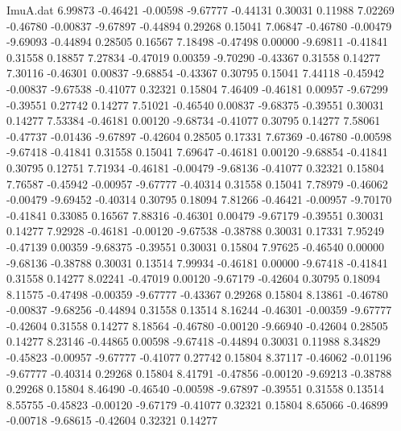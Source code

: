 \begin{filecontents}{ImuA.dat}
   6.99873   -0.46421   -0.00598   -9.67777   -0.44131    0.30031    0.11988
   7.02269   -0.46780   -0.00837   -9.67897   -0.44894    0.29268    0.15041
   7.06847   -0.46780   -0.00479   -9.69093   -0.44894    0.28505    0.16567
   7.18498   -0.47498    0.00000   -9.69811   -0.41841    0.31558    0.18857
   7.27834   -0.47019    0.00359   -9.70290   -0.43367    0.31558    0.14277
   7.30116   -0.46301    0.00837   -9.68854   -0.43367    0.30795    0.15041
   7.44118   -0.45942   -0.00837   -9.67538   -0.41077    0.32321    0.15804
   7.46409   -0.46181    0.00957   -9.67299   -0.39551    0.27742    0.14277
   7.51021   -0.46540    0.00837   -9.68375   -0.39551    0.30031    0.14277
   7.53384   -0.46181    0.00120   -9.68734   -0.41077    0.30795    0.14277
   7.58061   -0.47737   -0.01436   -9.67897   -0.42604    0.28505    0.17331
   7.67369   -0.46780   -0.00598   -9.67418   -0.41841    0.31558    0.15041
   7.69647   -0.46181    0.00120   -9.68854   -0.41841    0.30795    0.12751
   7.71934   -0.46181   -0.00479   -9.68136   -0.41077    0.32321    0.15804
   7.76587   -0.45942   -0.00957   -9.67777   -0.40314    0.31558    0.15041
   7.78979   -0.46062   -0.00479   -9.69452   -0.40314    0.30795    0.18094
   7.81266   -0.46421   -0.00957   -9.70170   -0.41841    0.33085    0.16567
   7.88316   -0.46301    0.00479   -9.67179   -0.39551    0.30031    0.14277
   7.92928   -0.46181   -0.00120   -9.67538   -0.38788    0.30031    0.17331
   7.95249   -0.47139    0.00359   -9.68375   -0.39551    0.30031    0.15804
   7.97625   -0.46540    0.00000   -9.68136   -0.38788    0.30031    0.13514
   7.99934   -0.46181    0.00000   -9.67418   -0.41841    0.31558    0.14277
   8.02241   -0.47019    0.00120   -9.67179   -0.42604    0.30795    0.18094
   8.11575   -0.47498   -0.00359   -9.67777   -0.43367    0.29268    0.15804
   8.13861   -0.46780   -0.00837   -9.68256   -0.44894    0.31558    0.13514
   8.16244   -0.46301   -0.00359   -9.67777   -0.42604    0.31558    0.14277
   8.18564   -0.46780   -0.00120   -9.66940   -0.42604    0.28505    0.14277
   8.23146   -0.44865    0.00598   -9.67418   -0.44894    0.30031    0.11988
   8.34829   -0.45823   -0.00957   -9.67777   -0.41077    0.27742    0.15804
   8.37117   -0.46062   -0.01196   -9.67777   -0.40314    0.29268    0.15804
   8.41791   -0.47856   -0.00120   -9.69213   -0.38788    0.29268    0.15804
   8.46490   -0.46540   -0.00598   -9.67897   -0.39551    0.31558    0.13514
   8.55755   -0.45823   -0.00120   -9.67179   -0.41077    0.32321    0.15804
   8.65066   -0.46899   -0.00718   -9.68615   -0.42604    0.32321    0.14277

\end{filecontents}
